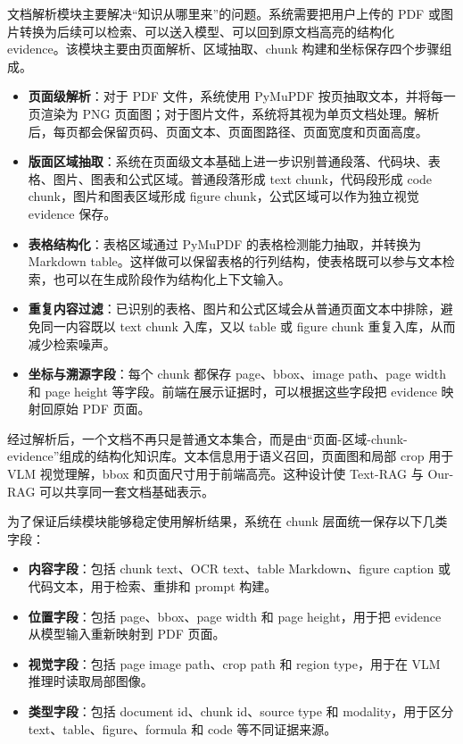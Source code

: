 文档解析模块主要解决“知识从哪里来”的问题。系统需要把用户上传的 PDF 或图片转换为后续可以检索、可以送入模型、可以回到原文档高亮的结构化 evidence。该模块主要由页面解析、区域抽取、chunk 构建和坐标保存四个步骤组成。

\begin{itemize}
  \item \textbf{页面级解析}：对于 PDF 文件，系统使用 PyMuPDF 按页抽取文本，并将每一页渲染为 PNG 页面图；对于图片文件，系统将其视为单页文档处理。解析后，每页都会保留页码、页面文本、页面图路径、页面宽度和页面高度。
  \item \textbf{版面区域抽取}：系统在页面级文本基础上进一步识别普通段落、代码块、表格、图片、图表和公式区域。普通段落形成 text chunk，代码段形成 code chunk，图片和图表区域形成 figure chunk，公式区域可以作为独立视觉 evidence 保存。
  \item \textbf{表格结构化}：表格区域通过 PyMuPDF 的表格检测能力抽取，并转换为 Markdown table。这样做可以保留表格的行列结构，使表格既可以参与文本检索，也可以在生成阶段作为结构化上下文输入。
  \item \textbf{重复内容过滤}：已识别的表格、图片和公式区域会从普通页面文本中排除，避免同一内容既以 text chunk 入库，又以 table 或 figure chunk 重复入库，从而减少检索噪声。
  \item \textbf{坐标与溯源字段}：每个 chunk 都保存 page、bbox、image path、page width 和 page height 等字段。前端在展示证据时，可以根据这些字段把 evidence 映射回原始 PDF 页面。
\end{itemize}

经过解析后，一个文档不再只是普通文本集合，而是由“页面-区域-chunk-evidence”组成的结构化知识库。文本信息用于语义召回，页面图和局部 crop 用于 VLM 视觉理解，bbox 和页面尺寸用于前端高亮。这种设计使 Text-RAG 与 Our-RAG 可以共享同一套文档基础表示。

为了保证后续模块能够稳定使用解析结果，系统在 chunk 层面统一保存以下几类字段：

\begin{itemize}
  \item \textbf{内容字段}：包括 chunk text、OCR text、table Markdown、figure caption 或代码文本，用于检索、重排和 prompt 构建。
  \item \textbf{位置字段}：包括 page、bbox、page width 和 page height，用于把 evidence 从模型输入重新映射到 PDF 页面。
  \item \textbf{视觉字段}：包括 page image path、crop path 和 region type，用于在 VLM 推理时读取局部图像。
  \item \textbf{类型字段}：包括 document id、chunk id、source type 和 modality，用于区分 text、table、figure、formula 和 code 等不同证据来源。
\end{itemize}

